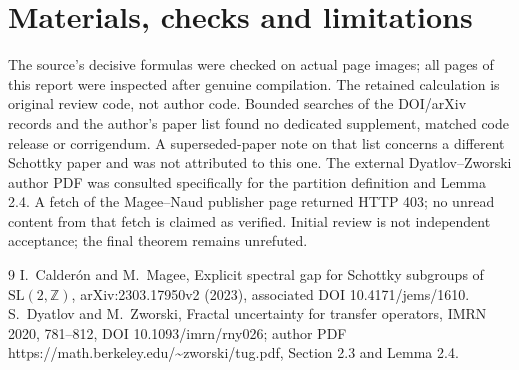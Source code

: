 \documentclass[10pt]{article}
\begin{document}
\section*{Materials, checks and limitations}
The source’s decisive formulas were checked on actual page images; all pages of this report were inspected after genuine compilation. The retained calculation is original review code, not author code. Bounded searches of the DOI/arXiv records and the author’s paper list found no dedicated supplement, matched code release or corrigendum. A superseded-paper note on that list concerns a different Schottky paper and was not attributed to this one. The external Dyatlov–Zworski author PDF was consulted specifically for the partition definition and Lemma 2.4. A fetch of the Magee–Naud publisher page returned HTTP 403; no unread content from that fetch is claimed as verified. Initial review is not independent acceptance; the final theorem remains unrefuted.\par
9 I. Calderón and M. Magee, Explicit spectral gap for Schottky subgroups of \(\mathrm{SL}(2,\mathbb Z)\), arXiv:2303.17950v2 (2023), associated DOI 10.4171/jems/1610. S. Dyatlov and M. Zworski, Fractal uncertainty for transfer operators, IMRN 2020, 781–812, DOI 10.1093/imrn/rny026; author PDF https://math.berkeley.edu/\textasciitilde{}zworski/tug.pdf, Section 2.3 and Lemma 2.4.\par
\end{document}

